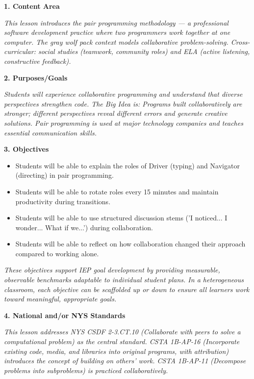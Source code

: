 \documentclass[11pt,letterpaper]{article}
\begin{document}
\textbf{1. Content Area}

\textit{This lesson introduces the pair programming methodology --- a professional software development practice where two programmers work together at one computer. The gray wolf pack context models collaborative problem-solving. Cross-curricular: social studies (teamwork, community roles) and ELA (active listening, constructive feedback).}

\textbf{2. Purposes/Goals}

\textit{Students will experience collaborative programming and understand that diverse perspectives strengthen code. The Big Idea is: Programs built collaboratively are stronger; different perspectives reveal different errors and generate creative solutions. Pair programming is used at major technology companies and teaches essential communication skills.}

\textbf{3. Objectives}

\begin{itemize}
  \item Students will be able to explain the roles of Driver (typing) and Navigator (directing) in pair programming.

  \item Students will be able to rotate roles every 15 minutes and maintain productivity during transitions.

  \item Students will be able to use structured discussion stems ('I noticed... I wonder... What if we...') during collaboration.

  \item Students will be able to reflect on how collaboration changed their approach compared to working alone.
\end{itemize}

\textit{These objectives support IEP goal development by providing measurable, observable benchmarks adaptable to individual student plans. In a heterogeneous classroom, each objective can be scaffolded up or down to ensure all learners work toward meaningful, appropriate goals.}

\textbf{4. National and/or NYS Standards}

\textit{This lesson addresses NYS CSDF 2-3.CT.10 (Collaborate with peers to solve a computational problem) as the central standard. CSTA 1B-AP-16 (Incorporate existing code, media, and libraries into original programs, with attribution) introduces the concept of building on others' work. CSTA 1B-AP-11 (Decompose problems into subproblems) is practiced collaboratively.}
\end{document}
